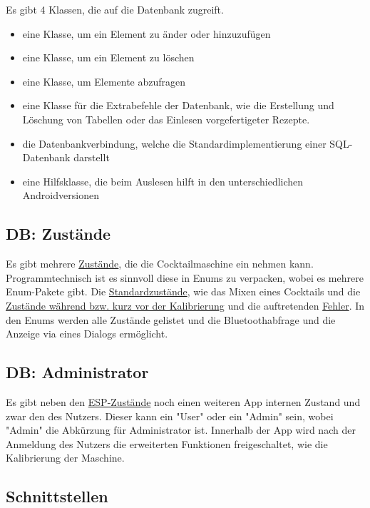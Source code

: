 Es gibt 4 Klassen, die auf die Datenbank zugreift.
\begin{itemize}
	\item eine Klasse, um ein Element zu änder oder hinzuzufügen 
	\item eine Klasse, um ein Element zu löschen
	\item eine Klasse, um Elemente abzufragen
	\item eine Klasse für die Extrabefehle der Datenbank, wie die Erstellung und Löschung von Tabellen  oder das Einlesen vorgefertigeter Rezepte.
	\item die Datenbankverbindung, welche die Standardimplementierung einer SQL-Datenbank darstellt
	\item eine Hilfsklasse, die beim Auslesen hilft in den unterschiedlichen Androidversionen
\end{itemize}



\subsection{DB: Zustände}
\label{sec:dbstatus}

Es gibt mehrere \hyperref[sec:status]{Zustände}, die die Cocktailmaschine ein nehmen kann. Programmtechnisch ist es sinnvoll diese in Enums zu verpacken, wobei es mehrere Enum-Pakete gibt. Die \hyperref[sec:statusrez]{Standardzustände}, wie das Mixen eines Cocktails und die \hyperref[sec:statuscal]{Zustände während bzw. kurz vor der Kalibrierung} und die auftretenden \hyperref[sec:statuserror]{Fehler}. In den Enums werden alle Zustände gelistet und die Bluetoothabfrage und die Anzeige via eines Dialogs ermöglicht.

\subsection{DB: Administrator}

Es gibt neben den \hyperref[sec:dbstatus]{ESP-Zustände} noch einen weiteren App internen Zustand und zwar den des Nutzers. Dieser kann ein "User" oder ein "Admin" sein, wobei "Admin" die Abkürzung für Administrator ist. Innerhalb der App wird nach der Anmeldung des Nutzers die erweiterten Funktionen freigeschaltet, wie die Kalibrierung der Maschine. 

\subsection{Schnittstellen}

